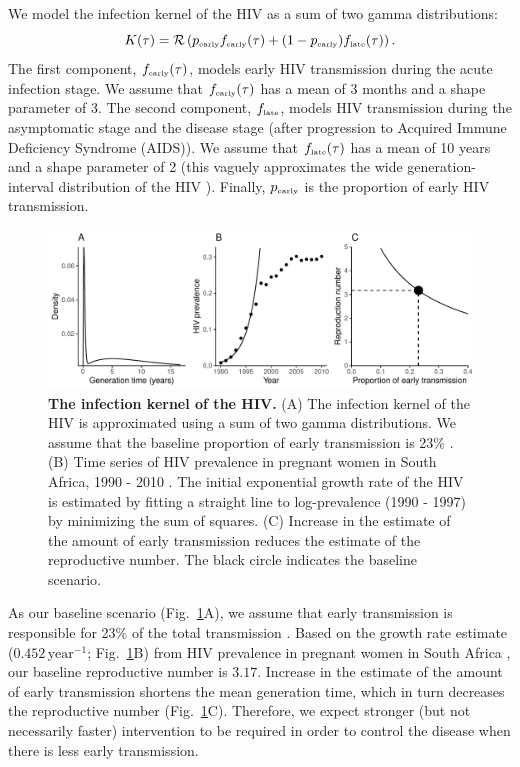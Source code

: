 \documentclass[12pt]{article}
\newcommand{\tsub}[2]{#1_{{\textrm{\tiny #2}}}}
\newcommand{\figref}[1]{Fig.~\ref{fig:#1}}
\newcommand{\figlab}[1]{\label{fig:#1}}
\begin{document}
We model the infection kernel of the HIV as a sum of two gamma distributions:
\begin{equation}
K(\tau) = \mathcal R \left(\tsub{p}{early} \tsub{f}{early}(\tau) + (1-\tsub{p}{early}) \tsub{f}{late}(\tau) \right).
\end{equation}
The first component, $\tsub{f}{early}(\tau)$, models early HIV transmission during the acute infection stage.
We assume that $\tsub{f}{early}(\tau)$ has a mean of 3 months \citep{hollingsworth2008hiv} and a shape parameter of 3.
The second component, $\tsub{f}{late}$, models HIV transmission during the asymptomatic stage and the disease stage (after progression to Acquired Immune Deficiency Syndrome (AIDS)).
We assume that $\tsub{f}{late}(\tau)$ has a mean of 10 years \citep{brookmeyer1989censoring, nishiura2019estimating} and a shape parameter of 2 (this vaguely approximates the wide generation-interval distribution of the HIV \citep{fraser2004factors}).
Finally, $\tsub{p}{early}$ is the proportion of early HIV transmission.

\begin{figure}[!th]
\includegraphics[width=\textwidth]{../figure/HIV.pdf}
\caption{
\textbf{The infection kernel of the HIV.}
(A) The infection kernel of the HIV is approximated using a sum of two gamma distributions. We assume that the baseline proportion of early transmission is 23\% \citep{hayes2006amplified}.
(B) Time series of HIV prevalence in pregnant women in South Africa, 1990 - 2010 \citep{barron2013eliminating}. The initial exponential growth rate of the HIV is estimated by fitting a straight line to log-prevalence (1990 - 1997) by minimizing the sum of squares.
(C) Increase in the estimate of the amount of early transmission reduces the estimate of the reproductive number.
The black circle indicates the baseline scenario.
}
\figlab{example}
\end{figure}

As our baseline scenario (\figref{example}A), we assume that early transmission is responsible for 23\% of the total transmission \citep{hayes2006amplified}.
Based on the growth rate estimate ($0.452\,\mathrm{year}^{-1}$; \figref{example}B) from HIV prevalence in pregnant women in South Africa \citep{barron2013eliminating}, our baseline reproductive number is $3.17$.
Increase in the estimate of the amount of early transmission shortens the mean generation time, which in turn decreases the reproductive number (\figref{example}C).
Therefore, we expect stronger (but not necessarily faster) intervention to be required in order to control the disease when there is less early transmission.
\end{document}
